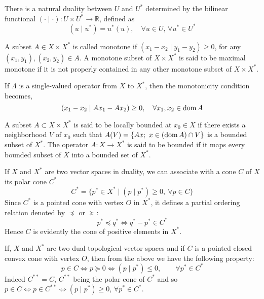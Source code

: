 \begin{remark}
	There is a natural duality between $U$ and $U^*$ determined by the bilinear functional $(\cdot \mid \cdot): U\times U^*\rightarrow \mathbb{R}$, defined as \[(u \mid u^*)=u^*(u), \quad \forall u \in U, \, \forall u^* \in U^*\]
\end{remark}



\begin{definition}
	A subset $A \in X\times X^*$ is called monotone if
	$(x_1 - x_2 \mid y_1 - y_2 ) \geq 0$, for any $(x_1, y_1), (x_2, y_2) \in A$. A monotone subset of $X\times X^*$ is said to be maximal monotone if it is not properly contained in any other monotone subset of $X\times X^*$.
	
	If $\Lambda$ is a single-valued operator from $X$ to $X^*$, then the monotonicity condition becomes,
	\[
	(x_1-x_2 \mid Ax_1-Ax_2)\geq 0, \quad \forall x_1, x_2 \in \mathrm{dom\,} A
	\]
	
\end{definition}

\begin{definition}
	A subset $A \subset X \times X^*$ is said to be locally bounded at $x_0 \in X$ if there exists a neighborhood $V$ of $x_0$ such that $A(V) = \{Ax;\ x \in (\mathrm{dom\,} A) \cap V \}$ is a
	bounded subset of $X^*$. The operator $A: X \rightarrow X^*$ is said to be bounded if it maps every bounded subset of $X$ into a bounded set of $X^*$.
\end{definition}

\begin{remark}
	If $X$ and $X^*$ are two vector spaces in duality, we can associate with a cone $C$ of $X$ its polar cone $C^*$
	\[
	C^* =\{p^* \in X^* \mid (p \mid p^*) \geq 0, \ \forall p \in C\}
	\]
	Since $C^*$ is a pointed cone with vertex $O$ in $X^*$, it defines a partial ordering relation denoted by $\preceq$ or $\succeq$:
	\[
	p^* \preceq q^* \iff q^* -p^* \in C^*
	\]
	Hence $C$ is evidently the cone of positive elements in $X^*$.
	
	If, $X$ and $X^*$ are two dual topological vector spaces and if $C$ is a pointed closed convex cone with vertex $O$, then from the above we have the following property:
	\[
	p \in C \iff p \succeq 0 \iff (p \mid p^*)\leq 0, \qquad \forall p^* \in C^*
	\]
	Indeed $C^{**}=C$, $C^{**}$ being the polar cone of $C^*$ and so $p \in C \iff p \in C^{**} \iff (p\mid p^*) \geq 0$, $\forall p^* \in C^*$. 
\end{remark}

